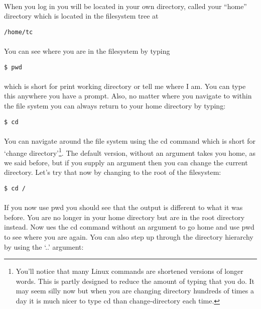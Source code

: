 \documentclass[12pt, a4paper, twoside]{book}
\begin{document}
\paragraph{} When you log in you will be located in your own directory, called your ``home'' directory which is located in the filesystem tree at 

\begin{lstlisting}[style=DOS]
    /home/tc
\end{lstlisting}
\paragraph{} You can see where you are in the filesystem by typing

\begin{lstlisting}[style=DOS]
    $ pwd
\end{lstlisting}
\paragraph{} which is short for print working directory or tell me where I am. You can type this anywhere you have a prompt. Also, no matter where you navigate to within the file system you can always return to your home directory by typing:

\begin{lstlisting}[style=DOS]
    $ cd
\end{lstlisting}

\paragraph{} You can navigate around the file system using the cd command which is short for `change directory'\footnote{You'll notice that many Linux commands are shortened versions of longer words. This is partly designed to reduce the amount of typing that you do. It may seem silly now but when you are changing directory hundreds of times a day it is much nicer to type cd than change-directory each time.}. The default version, without an argument takes you home, as we said before, but if you supply an argument then you can change the current directory. Let's try that now by changing to the root of the filesystem:

\begin{lstlisting}[style=DOS]
    $ cd /
\end{lstlisting}
\paragraph{} If you now use pwd you should see that the output is different to what it was before. You are no longer in your home directory but are in the root directory instead. Now ues the cd command without an argument to go home and use pwd to see where you are again. You can also step up through the directory hierarchy by using the `..' argument:
\end{document}
